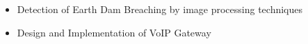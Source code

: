 \documentclass[10pt,a4paper]{altacv}
\begin{document}
\begin{paracol}{2}
\begin{itemize}
	\item Detection of Earth Dam Breaching by image processing techniques
\end{itemize}

\begin{itemize}
	\item Design and Implementation of VoIP Gateway
\end{itemize}





	
		
		

\end{paracol}
\end{document}
